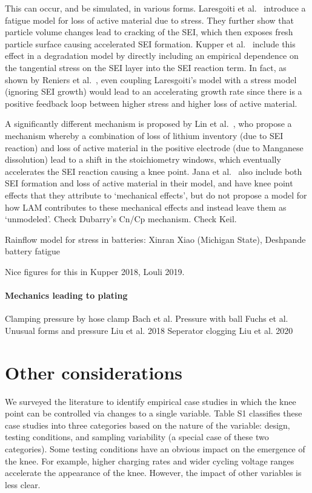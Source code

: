 \documentclass{article}
\begin{document}
This can occur, and be simulated, in various forms.
Laresgoiti et al.~\cite{laresgoiti_modeling_2015} introduce a fatigue model for loss of active material due to stress. They further show that particle volume changes lead to cracking of the SEI, which then exposes fresh particle surface causing accelerated SEI formation. Kupper et al.~\cite{kupper_end--life_2018} include this effect in a degradation model by directly including an empirical dependence on the tangential stress on the SEI layer into the SEI reaction term. In fact, as shown by Reniers et al.~\cite{reniers_review_2019}, even coupling Laresgoiti's model with a stress model (ignoring SEI growth) would lead to an accelerating growth rate since there is a positive feedback loop between higher stress and higher loss of active material.

A significantly different mechanism is proposed by Lin et al.~\cite{lin_comprehensive_2013}, who propose a mechanism whereby a combination of loss of lithium inventory (due to SEI reaction) and loss of active material in the positive electrode (due to Manganese dissolution) lead to a shift in the stoichiometry windows, which eventually accelerates the SEI reaction causing a knee point.
Jana et al.~\cite{jana_physical_2019} also include both SEI formation and loss of active material in their model, and have knee point effects that they attribute to `mechanical effects', but do not propose a model for how LAM contributes to these mechanical effects and instead leave them as `unmodeled'.
Check Dubarry's Cn/Cp mechanism.
Check Keil.

Rainflow model for stress in batteries: Xinran Xiao (Michigan State), Deshpande battery fatigue

Nice figures for this in Kupper 2018, Louli 2019.

\paragraph{Mechanics leading to plating}
Clamping pressure by hose clamp Bach et al. \cite{bach_nonlinear_2016}
Pressure with ball Fuchs et al. \cite{fuchs_post-mortem_2019}
Unusual forms and pressure Liu et al. 2018 \cite{liu_size_2018}
Seperator clogging Liu et al. 2020 \cite{liu_effects_2020}

\section{Other considerations}

We surveyed the literature to identify empirical case studies in which the knee point can be controlled via changes to a single variable. Table S1 classifies these case studies into three categories based on the nature of the variable: design, testing conditions, and sampling variability (a special case of these two categories). Some testing conditions have an obvious impact on the emergence of the knee. For example, higher charging rates and wider cycling voltage ranges accelerate the appearance of the knee. However, the impact of other variables is less clear. 
\end{document}
